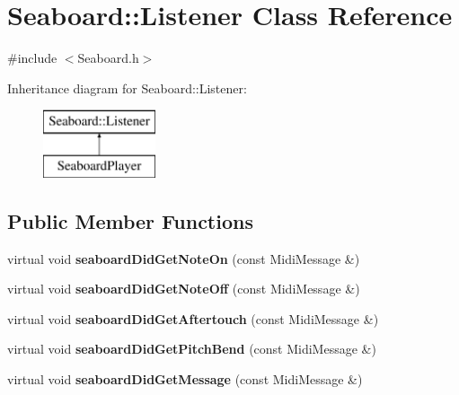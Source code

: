 \hypertarget{class_seaboard_1_1_listener}{\section{Seaboard\-:\-:Listener Class Reference}
\label{class_seaboard_1_1_listener}
}


{\ttfamily \#include $<$Seaboard.\-h$>$}

Inheritance diagram for Seaboard\-:\-:Listener\-:\begin{figure}[H]
\begin{center}
\leavevmode
\includegraphics[height=2.000000cm]{class_seaboard_1_1_listener}
\end{center}
\end{figure}
\subsection*{Public Member Functions}
\begin{DoxyCompactItemize}
\item 
\hypertarget{class_seaboard_1_1_listener_a3755edd0a66af95eae6c35208109f970}{virtual void {\bfseries seaboard\-Did\-Get\-Note\-On} (const Midi\-Message \&)}\label{class_seaboard_1_1_listener_a3755edd0a66af95eae6c35208109f970}

\item 
\hypertarget{class_seaboard_1_1_listener_ad90dbe86e691266dd9bb425b63f9130b}{virtual void {\bfseries seaboard\-Did\-Get\-Note\-Off} (const Midi\-Message \&)}\label{class_seaboard_1_1_listener_ad90dbe86e691266dd9bb425b63f9130b}

\item 
\hypertarget{class_seaboard_1_1_listener_a6341cb602b1596395592e8d05b43a309}{virtual void {\bfseries seaboard\-Did\-Get\-Aftertouch} (const Midi\-Message \&)}\label{class_seaboard_1_1_listener_a6341cb602b1596395592e8d05b43a309}

\item 
\hypertarget{class_seaboard_1_1_listener_afd1e778ebd1c80befc32db57c4378335}{virtual void {\bfseries seaboard\-Did\-Get\-Pitch\-Bend} (const Midi\-Message \&)}\label{class_seaboard_1_1_listener_afd1e778ebd1c80befc32db57c4378335}

\item 
\hypertarget{class_seaboard_1_1_listener_a528a887b7484285a193c9737dedf935a}{virtual void {\bfseries seaboard\-Did\-Get\-Message} (const Midi\-Message \&)}\label{class_seaboard_1_1_listener_a528a887b7484285a193c9737dedf935a}

\end{DoxyCompactItemize}


